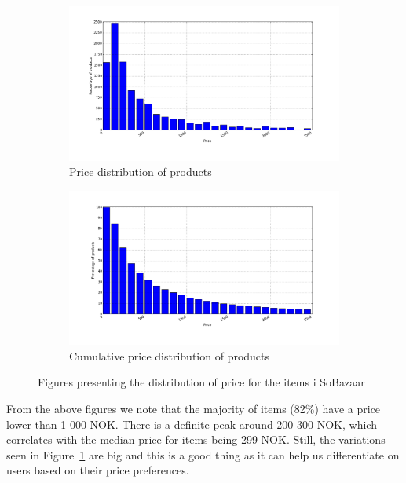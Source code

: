 \begin{figure}[H]
  \centering
  \begin{subfigure}{.5\textwidth}
      \includegraphics[width=\dualGraphWidth]{image/priceDistributiondistribution.png}
      \centering
      \caption{Price distribution of products}
      \label{figure:pricePerProduct}
  \end{subfigure}%
  \begin{subfigure}{.5\textwidth}
      \includegraphics[width=\dualGraphWidth]{image/cumpriceDistributiondistribution.png}
      \centering
      \caption{Cumulative price distribution of products}
      \label{figure:pricePerProductCum}
  \end{subfigure}
  \caption{Figures presenting the distribution of price for the items i SoBazaar}
\end{figure}

From the above figures we note that the majority of items (82\%) have a price
lower than 1 000 NOK. There is a definite peak around 200-300 NOK, which
correlates with the median price for items being 299 NOK.  Still, the
variations seen in Figure~\ref{figure:pricePerProduct} are big and this is a
good thing as it can help us differentiate on users based on their price
preferences.

